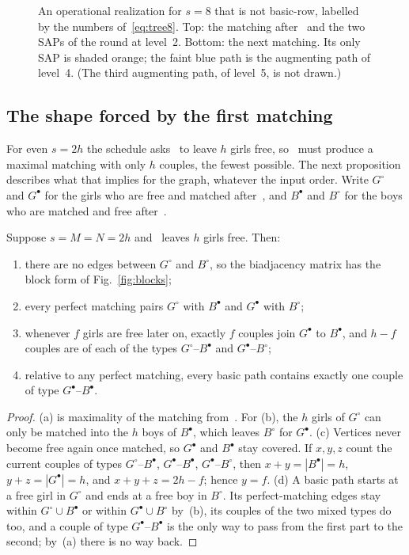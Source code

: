 \begin{figure}[ht]
\centering

\caption{An operational realization for $s=8$ that is not basic-row,
labelled by the numbers of~\eqref{eq:tree8}. Top: the matching after~
and the two SAPs of the round at level~2. Bottom: the next matching. Its
only SAP is shaded orange; the faint blue path is the augmenting path of
level~4. (The third augmenting path, of level~5, is not drawn.)}
\label{fig:tree8}
\end{figure}

\subsection{The shape forced by the first matching}
\label{sec:blocks}

For even $s=2h$ the schedule asks~ to leave $h$ girls free, so~ must
produce a maximal matching with only $h$ couples, the fewest possible. The
next proposition describes what that implies for the graph, whatever the
input order. Write $G^\circ$ and $G^\bullet$ for the girls who are free and
matched after~, and $B^\bullet$ and $B^\circ$ for the boys who are
matched and free after~.

\begin{proposition}
\label{prop:blocks}
Suppose $s=M=N=2h$ and~ leaves $h$ girls free. Then:
\begin{enumerate}[label=(\alph*)]
\item there are no edges between $G^\circ$ and $B^\circ$, so the biadjacency
  matrix has the block form of Fig.~\ref{fig:blocks};
\item every perfect matching pairs $G^\circ$ with $B^\bullet$ and $G^\bullet$
  with $B^\circ$;
\item whenever $f$ girls are free later on, exactly $f$ couples join
  $G^\bullet$ to $B^\bullet$, and $h-f$ couples are of each of the types
  $G^\circ$--$B^\bullet$ and $G^\bullet$--$B^\circ$;
\item relative to any perfect matching, every basic path contains exactly
  one couple of type $G^\bullet$--$B^\bullet$.
\end{enumerate}
\end{proposition}

\begin{proof}
(a) is maximality of the matching from~. For (b), the $h$ girls of
$G^\circ$ can only be matched into the $h$ boys of $B^\bullet$, which leaves
$B^\circ$ for $G^\bullet$. (c) Vertices never become free again once
matched, so $G^\bullet$ and $B^\bullet$ stay covered. If $x,y,z$ count the
current couples of types $G^\circ$--$B^\bullet$, $G^\bullet$--$B^\bullet$,
$G^\bullet$--$B^\circ$, then $x+y=|B^\bullet|=h$, $y+z=|G^\bullet|=h$, and
$x+y+z=2h-f$; hence $y=f$. (d) A basic path starts at a free girl in
$G^\circ$ and ends at a free boy in $B^\circ$. Its perfect-matching edges
stay within $G^\circ\cup B^\bullet$ or within $G^\bullet\cup B^\circ$
by~(b), its couples of the two mixed types do too, and a couple of type
$G^\bullet$--$B^\bullet$ is the only way to pass from the first part to the
second; by~(a) there is no way back.
\end{proof}

